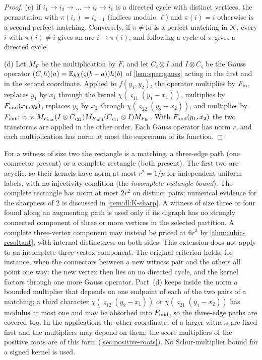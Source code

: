 \begin{proof}
(c) If $i_1\to i_2\to\dots\to i_\ell\to i_1$ is a directed cycle with distinct
vertices, the permutation with $\pi(i_s)=i_{s+1}$ (indices modulo $\ell$) and
$\pi(i)=i$ otherwise is a second perfect matching. Conversely, if $\pi\ne\mathrm{id}$
is a perfect matching in $\mathcal K$, every $i$ with $\pi(i)\ne i$ gives an arc
$i\to\pi(i)$, and following a cycle of $\pi$ gives a directed cycle.

(d) Let $M_F$ be the multiplication by $F$, and let $C_\varsigma\otimes I$ and
$I\otimes C_\varsigma$ be the Gauss operator
$(C_\varsigma h)(a)=\mathbb E_b\chi(\varsigma(b-a))h(b)$ of \cref{lem:spec:gauss} acting in the
first and in the second coordinate. Applied to $f(y_1,y_2)$, the operator multiplies
by $F_{\rm in}$, replaces $y_1$ by $x_1$ through the kernel
$\chi(\varsigma_{11}(y_1-x_1))$, multiplies by $F_{\rm mid}(x_1,y_2)$, replaces $y_2$
by $x_2$ through $\chi(\varsigma_{22}(y_2-x_2))$, and multiplies by $F_{\rm out}$: it
is $M_{F_{\rm out}}(I\otimes C_{\varsigma_{22}})M_{F_{\rm mid}}(C_{\varsigma_{11}}\otimes
I)M_{F_{\rm in}}$. With $F_{\rm mid}(y_1,x_2)$ the two transforms are applied in the
other order. Each Gauss operator has norm $r$, and each multiplication has norm at
most the supremum of its function.
\end{proof}

\begin{remark}\label{rem:extraction-kernels}
For a witness of size two the rectangle is a matching, a three-edge path (one
connector present) or a complete rectangle (both present). The first two are
acyclic, so their kernels have norm at most $r^2=1/p$ for independent uniform
labels, with no injectivity condition (the \emph{incomplete-rectangle bound}). The
complete rectangle has norm at most $2r^2$ on distinct pairs; numerical evidence
for the sharpness of $2$ is discussed in \cref{rem:dl:K-sharp}. A witness of size
three or four found along an augmenting path is used only if its digraph has no
 strongly connected component of three or more vertices in the selected
 partition. A complete three-vertex component may instead be priced at
 $6r^3$ by \cref{thm:cubic-resultant}, with internal distinctness on
 both sides. This extension does not apply to an incomplete three-vertex
 component. The original criterion holds, for instance,
when the connectors between a new witness pair and the others all point one way:
the new vertex then lies on no directed cycle, and the kernel factors through one
more Gauss operator. Part~(d) keeps inside the norm a bounded multiplier that depends
on one endpoint of each of the two pairs of a matching; a third character
$\chi(\varsigma_{12}(y_2-x_1))$ or $\chi(\varsigma_{21}(y_1-x_2))$ has modulus at most
one and may be absorbed into $F_{\rm mid}$, so the three-edge paths are covered too.
In the applications the other coordinates of a larger witness are fixed first and the
multipliers may depend on them; the score multipliers of the positive roots are of
this form (\cref{sec:positive-roots}). No Schur-multiplier bound for a signed kernel
is used.
\end{remark}

